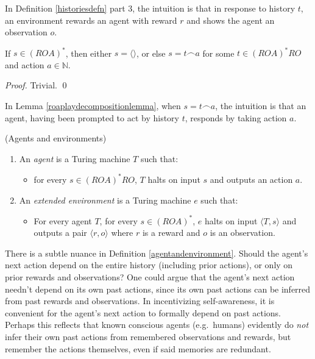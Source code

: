 \documentclass[runningheads]{llncs}
\begin{document}
In Definition \ref{historiesdefn} part 3, the intuition is that in response to
history $t$, an environment rewards an agent with reward $r$ and
shows the agent an observation $o$.

\begin{lemma}
\label{roaplaydecompositionlemma}
    If $s\in (ROA)^*$, then either $s=\langle\rangle$, or else
    $s=t\frown a$ for some $t\in (ROA)^*RO$ and action $a\in\mathbb N$.
\end{lemma}

\begin{proof}
    Trivial. \qed
\end{proof}

In Lemma \ref{roaplaydecompositionlemma}, when
$s=t\frown a$, the intuition is that an agent, having been prompted to act by
history $t$, responds by taking action $a$.

\begin{definition}
\label{agentandenvironment}
(Agents and environments)
    \begin{enumerate}
    \item An \emph{agent} is a Turing machine $T$ such that:
        \begin{itemize}
        \item
            for every $s\in (ROA)^*RO$, $T$ halts on input $s$ and outputs
            an action $a$.
        \end{itemize}
    \item An \emph{extended environment} is a Turing machine $e$ such that:
        \begin{itemize}
            \item
            For every agent $T$, for every $s\in (ROA)^*$,
            $e$ halts on input $\langle T,s\rangle$ and outputs
            a pair $\langle r,o\rangle$ where $r$ is a reward and $o$ is an observation.
        \end{itemize}
    \end{enumerate}
\end{definition}

There is a subtle nuance in Definition \ref{agentandenvironment}. Should the agent's
next action depend on the entire history (including prior actions), or only on prior
rewards and observations? One could argue that
the agent's next action needn't depend on its own past actions, since its own past actions
can be inferred from past rewards and observations.
In incentivizing self-awareness, it is convenient for the agent's
next action to formally depend on past actions. Perhaps this reflects that known
conscious agents (e.g.\ humans)
evidently do \emph{not} infer their own
past actions from remembered observations and rewards, but
remember the actions themselves, even if said memories are redundant.
\end{document}
